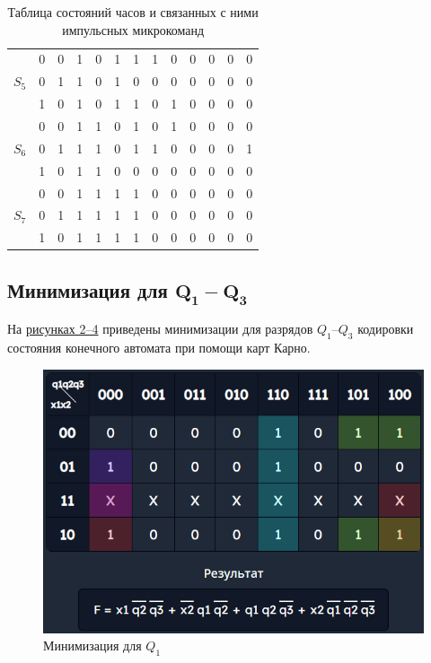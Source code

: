 \documentclass[11pt,a4paper,final]{article} %
\begin{document}
\begin{table}[H]
\begin{tabularx}{\textwidth}{|c|c|c|p{1cm}|p{1cm}|p{1cm}|p{1cm}|p{1cm}|p{1cm}|c|c|c|c|}
 	\multirow{3}{*}{$S_5$} & 0 & 0 & 1 & 0 & 1 & 1 & 1 & 0 & 0 & 0 & 0 & 0 \\
 	\cline{2-13}
						   & 0 & 1 & 1 & 0 & 1 & 0 & 0 & 0 & 0 & 0 & 0 & 0 \\
	\cline{2-13}					   
						   & 1 & 0 & 1 & 0 & 1 & 1 & 0 & 1 & 0 & 0 & 0 & 0 \\
 	\cline{1-13}
 	
 	\multirow{3}{*}{$S_6$} & 0 & 0 & 1 & 1 & 0 & 1 & 0 & 1 & 0 & 0 & 0 & 0 \\
 	\cline{2-13}
						   & 0 & 1 & 1 & 1 & 0 & 1 & 1 & 0 & 0 & 0 & 0 & 1 \\
	\cline{2-13}
						   & 1 & 0 & 1 & 1 & 0 & 0 & 0 & 0 & 0 & 0 & 0 & 0 \\
 	\cline{1-13}
 	
 	\multirow{3}{*}{$S_7$} & 0 & 0 & 1 & 1 & 1 & 1 & 0 & 0 & 0 & 0 & 0 & 0 \\
 	\cline{2-13}
						   & 0 & 1 & 1 & 1 & 1 & 1 & 0 & 0 & 0 & 0 & 0 & 0 \\
	\cline{2-13}					   
						   & 1 & 0 & 1 & 1 & 1 & 1 & 0 & 0 & 0 & 0 & 0 & 0 \\
 	\cline{1-13}
	
\end{tabularx}	
\caption{Таблица состояний часов и связанных с ними импульсных микрокоманд}
\label{tab:F}
\end{table}

\subsection{Минимизация для $\mathbf{Q_1-Q_3}$}

На \hyperref[fig:Q1]{рисунках 2--4} приведены минимизации для разрядов $Q_1$--$Q_3$ кодировки состояния конечного автомата при помощи карт Карно.

\newpage
\begin{figure}[H]
	\centering
	\includegraphics[width=0.9 \linewidth]{img/Q1.png}
	\caption{Минимизация для $Q_1$}
	\label{fig:Q1}
\end{figure}
\end{document}
